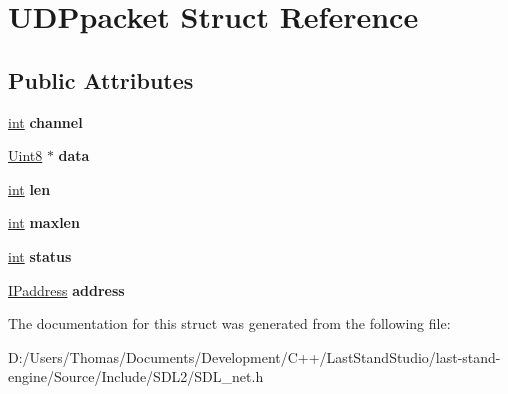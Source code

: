 \hypertarget{structUDPpacket}{}\section{U\+D\+Ppacket Struct Reference}
\label{structUDPpacket}
\subsection*{Public Attributes}
\begin{DoxyCompactItemize}
\item 
\hypertarget{structUDPpacket_a70fda2fb7dda00a9fdb8c8cad7ec7416}{}\hyperlink{SDL__thread_8h_a6a64f9be4433e4de6e2f2f548cf3c08e}{int} {\bfseries channel}\label{structUDPpacket_a70fda2fb7dda00a9fdb8c8cad7ec7416}

\item 
\hypertarget{structUDPpacket_a1e6b21a11fcfec1001e72972b5166814}{}\hyperlink{SDL__stdinc_8h_a2944638813a090aa23e62f4da842c3e2}{Uint8} $\ast$ {\bfseries data}\label{structUDPpacket_a1e6b21a11fcfec1001e72972b5166814}

\item 
\hypertarget{structUDPpacket_ac04342cf64fd3c773701b33c60b736ca}{}\hyperlink{SDL__thread_8h_a6a64f9be4433e4de6e2f2f548cf3c08e}{int} {\bfseries len}\label{structUDPpacket_ac04342cf64fd3c773701b33c60b736ca}

\item 
\hypertarget{structUDPpacket_a2a5ff99b39235cc0df3f44164ef4c968}{}\hyperlink{SDL__thread_8h_a6a64f9be4433e4de6e2f2f548cf3c08e}{int} {\bfseries maxlen}\label{structUDPpacket_a2a5ff99b39235cc0df3f44164ef4c968}

\item 
\hypertarget{structUDPpacket_a7fc298a8e3fcf38de3854e2e8f3e4c5d}{}\hyperlink{SDL__thread_8h_a6a64f9be4433e4de6e2f2f548cf3c08e}{int} {\bfseries status}\label{structUDPpacket_a7fc298a8e3fcf38de3854e2e8f3e4c5d}

\item 
\hypertarget{structUDPpacket_ab625ce37917a6c492fe266cb33ff348a}{}\hyperlink{structIPaddress}{I\+Paddress} {\bfseries address}\label{structUDPpacket_ab625ce37917a6c492fe266cb33ff348a}

\end{DoxyCompactItemize}


The documentation for this struct was generated from the following file\+:\begin{DoxyCompactItemize}
\item 
D\+:/\+Users/\+Thomas/\+Documents/\+Development/\+C++/\+Last\+Stand\+Studio/last-\/stand-\/engine/\+Source/\+Include/\+S\+D\+L2/S\+D\+L\+\_\+net.\+h\end{DoxyCompactItemize}
